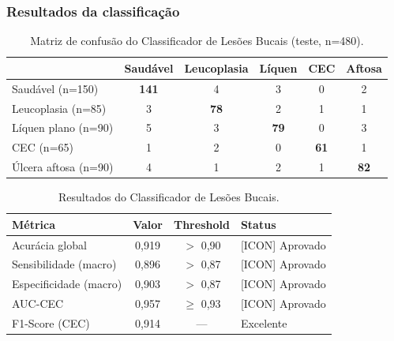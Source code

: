 \subsubsection{Resultados da classificação}

\begin{table}[H]
  \centering
  \caption{Matriz de confusão do Classificador de Lesões Bucais (teste, n=480).}
  \label{tab:lesion-confusion}
  \begin{tabularx}{\textwidth}{lccccc}
    \toprule
    & \textbf{Saudável} & \textbf{Leucoplasia} & \textbf{Líquen} & \textbf{CEC} & \textbf{Aftosa} \\
    \midrule
    Saudável (n=150) & \textbf{141} & 4 & 3 & 0 & 2 \\
    Leucoplasia (n=85) & 3 & \textbf{78} & 2 & 1 & 1 \\
    Líquen plano (n=90) & 5 & 3 & \textbf{79} & 0 & 3 \\
    CEC (n=65) & 1 & 2 & 0 & \textbf{61} & 1 \\
    Úlcera aftosa (n=90) & 4 & 1 & 2 & 1 & \textbf{82} \\
    \bottomrule
  \end{tabularx}
\end{table}

\begin{table}[H]
  \centering
  \caption{Resultados do Classificador de Lesões Bucais.}
  \label{tab:lesion-results}
  \begin{tabularx}{\textwidth}{lccX}
    \toprule
    \textbf{Métrica} & \textbf{Valor} & \textbf{Threshold} & \textbf{Status} \\
    \midrule
    Acurácia global & 0,919 & $>$ 0,90 & \textcolor{corTesteSucesso}{[ICON] Aprovado} \\
    Sensibilidade (macro) & 0,896 & $>$ 0,87 & \textcolor{corTesteSucesso}{[ICON] Aprovado} \\
    Especificidade (macro) & 0,903 & $>$ 0,87 & \textcolor{corTesteSucesso}{[ICON] Aprovado} \\
    AUC-CEC & 0,957 & $\geq$ 0,93 & \textcolor{corTesteSucesso}{[ICON] Aprovado} \\
    F1-Score (CEC) & 0,914 & — & Excelente \\
    \bottomrule
  \end{tabularx}
\end{table}


